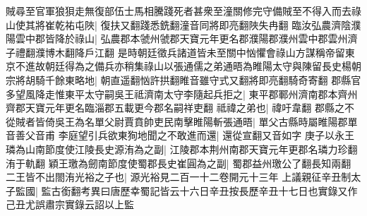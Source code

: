 賊尋至官軍狼狽走無復部伍士馬相騰踐死者甚衆至潼關修完守備賊至不得入而去祿山使其將崔乾祐屯陜|{
	復扶又翻踐悉銑翻潼音同將即亮翻陜失冉翻}
臨汝弘農濟陰濮陽雲中郡皆降於祿山|{
	弘農郡本虢州虢郡天寶元年更名郡濮陽郡濮州雲中郡雲州濟子禮翻濮博木翻降戶江翻}
是時朝廷徵兵諸道皆未至關中忷懼會祿山方謀稱帝留東京不進故朝廷得為之備兵亦稍集祿山以張通儒之弟通晤為睢陽太守與陳留長史楊朝宗將胡騎千餘東略地|{
	朝直遥翻忷許拱翻睢音雖守式又翻將即亮翻騎奇寄翻}
郡縣官多望風降走惟東平太守嗣吳王祗濟南太守李隨起兵拒之|{
	東平郡鄆州濟南郡本齊州齊郡天寶元年更名臨淄郡五載更今郡名嗣祥吏翻}
祗禕之弟也|{
	禕吁韋翻}
郡縣之不從賊者皆倚吳王為名單父尉賈賁帥吏民南擊睢陽斬張通晤|{
	單父古縣時屬睢陽郡單音善父音甫}
李庭望引兵欲東狥地聞之不敢進而還|{
	還從宣翻又音如字}
庚子以永王璘為山南節度使江陵長史源洧為之副|{
	江陵郡本荆州南郡天寶元年更郡名璘力珍翻洧于軌翻}
穎王璬為劒南節度使蜀郡長史崔圓為之副|{
	蜀郡益州璬公了翻長知兩翻}
二王皆不出閤洧光裕之子也|{
	源光裕見二百一十二卷開元十三年}
上議親征辛丑制太子監國|{
	監古銜翻考異曰唐歷幸蜀記皆云十六日辛丑按長歷辛丑十七日也實錄又作己丑尤誤肅宗實錄云詔以上監}


